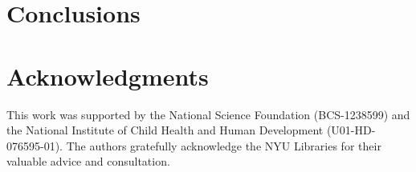 \documentclass{sig-alternate}
\begin{document}
\section{Conclusions}

\section*{Acknowledgments}

This work was supported by the National Science Foundation (BCS-1238599) and the National Institute of Child Health and Human Development (U01-HD-076595-01).
The authors gratefully acknowledge the NYU Libraries for their valuable advice and consultation.



\end{document}
